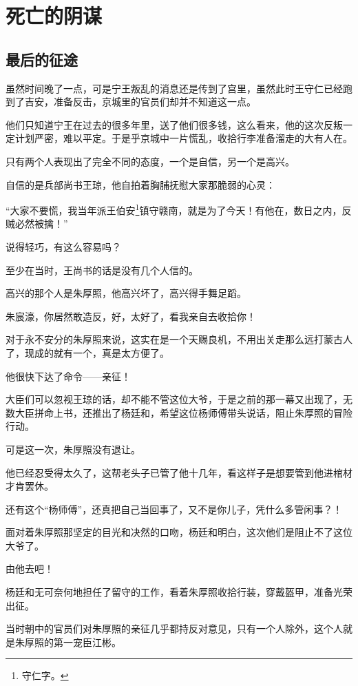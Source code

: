 \section{死亡的阴谋}
\ifnum{}
	\begin{multicols}{\theparacolNo}
\fi
\subsection{最后的征途}
虽然时间晚了一点，可是宁王叛乱的消息还是传到了宫里，虽然此时王守仁已经跑到了吉安，准备反击，京城里的官员们却并不知道这一点。

他们只知道宁王在过去的很多年里，送了他们很多钱，这么看来，他的这次反叛一定计划严密，难以平定。于是乎京城中一片慌乱，收拾行李准备溜走的大有人在。

只有两个人表现出了完全不同的态度，一个是自信，另一个是高兴。

自信的是兵部尚书王琼，他自拍着胸脯抚慰大家那脆弱的心灵：

“大家不要慌，我当年派王伯安\footnote{守仁字。}镇守赣南，就是为了今天！有他在，数日之内，反贼必然被擒！”

说得轻巧，有这么容易吗？

至少在当时，王尚书的话是没有几个人信的。

高兴的那个人是朱厚照，他高兴坏了，高兴得手舞足蹈。

朱宸濠，你居然敢造反，好，太好了，看我亲自去收拾你！

对于永不安分的朱厚照来说，这实在是一个天赐良机，不用出关走那么远打蒙古人了，现成的就有一个，真是太方便了。

他很快下达了命令——亲征！

大臣们可以忽视王琼的话，却不能不管这位大爷，于是之前的那一幕又出现了，无数大臣拼命上书，还推出了杨廷和，希望这位杨师傅带头说话，阻止朱厚照的冒险行动。

可是这一次，朱厚照没有退让。

他已经忍受得太久了，这帮老头子已管了他十几年，看这样子是想要管到他进棺材才肯罢休。

还有这个“杨师傅”，还真把自己当回事了，又不是你儿子，凭什么多管闲事？！

面对着朱厚照那坚定的目光和决然的口吻，杨廷和明白，这次他们是阻止不了这位大爷了。

由他去吧！

杨廷和无可奈何地担任了留守的工作，看着朱厚照收拾行装，穿戴盔甲，准备光荣出征。

当时朝中的官员们对朱厚照的亲征几乎都持反对意见，只有一个人除外，这个人就是朱厚照的第一宠臣江彬。


\end{multicols}

